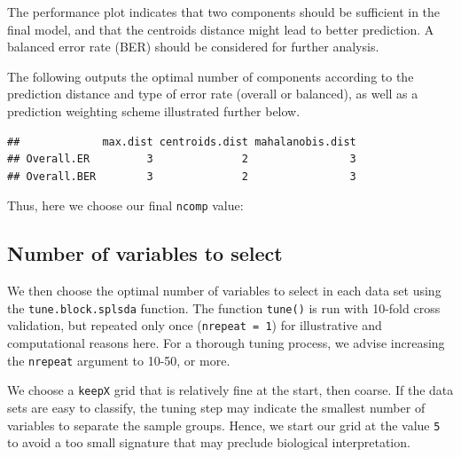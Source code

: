 \documentclass[]{book}
\newenvironment{Shaded}{\begin{snugshade}}{\end{snugshade}}
\newcommand{\StringTok}[1]{\textcolor[rgb]{0.31,0.60,0.02}{#1}}
\newcommand{\OperatorTok}[1]{\textcolor[rgb]{0.81,0.36,0.00}{\textbf{#1}}}
\newcommand{\NormalTok}[1]{#1}
\begin{document}
The performance plot indicates that two components should be sufficient
in the final model, and that the centroids distance might lead to better
prediction. A balanced error rate (BER) should be considered for further
analysis.

The following outputs the optimal number of components according to the
prediction distance and type of error rate (overall or balanced), as
well as a prediction weighting scheme illustrated further below.

\begin{Shaded}
\end{Shaded}

\begin{verbatim}
##             max.dist centroids.dist mahalanobis.dist
## Overall.ER         3              2                3
## Overall.BER        3              2                3
\end{verbatim}

Thus, here we choose our final \texttt{ncomp} value:

\begin{Shaded}
\end{Shaded}

\subsection{Number of variables to select}\label{diablo:numvar}

We then choose the optimal number of variables to select in each data
set using the \texttt{tune.block.splsda} function. The function
\texttt{tune()} is run with 10-fold cross validation, but repeated only
once (\texttt{nrepeat\ =\ 1}) for illustrative and computational reasons
here. For a thorough tuning process, we advise increasing the
\texttt{nrepeat} argument to 10-50, or more.

We choose a \texttt{keepX} grid that is relatively fine at the start,
then coarse. If the data sets are easy to classify, the tuning step may
indicate the smallest number of variables to separate the sample groups.
Hence, we start our grid at the value \texttt{5} to avoid a too small
signature that may preclude biological interpretation.
\end{document}
